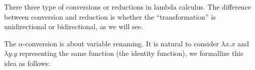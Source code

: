 \documentclass[../../../include/open-logic-section]{subfiles}
\begin{document}

There three type of conversions or reductions in lambda calculus. The
difference between conversion and reduction is whether the
``transformation'' is unidirectional or bidirectional, as we will see.

The $\alpha$-conversion is about variable renaming. It is natural to
consider $\lambda x. x$ and $\lambda y.y$ representing the same
function (the identity function), we formallize this idea as follows:
\end{document}
